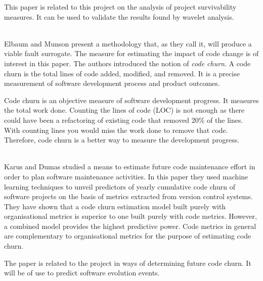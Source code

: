 \begin{description}
		This paper is related to this project on the analysis of project survivability
		measures. It can be used to validate the results found by wavelet analysis.
	
	\item[\cite{elbaum}] \hfill \\
		Elbaum and Munson present a methodology that, as they call it, will produce a
		viable fault surrogate. The measure for estimating the impact of code change
		is of interest in this paper. The authors introduced the notion of \emph{code
		churn}. A code churn is the total lines of code added, modified, and removed.
		It is a precise measurement of software development process and product
		outcomes.

		Code churn is an objective measure of software development progress. It
		measures the total work done. Counting the lines of code (LOC) is not enough
		as there could have been a refactoring of existing code that removed 20\% of
		the lines. With counting lines you would miss the work done to remove that
		code. Therefore, code churn is a better way to measure the development
		progress.
	
	\item[\cite{dumas}] \hfill \\
		Karus and Dumas studied a means to estimate future code maintenance effort in
		order to plan software maintenance activities. In this paper they used machine
		learning techniques to unveil predictors of yearly cumulative code churn of
		software projects on the basis of metrics extracted from version control
		systems. They have shown that a code churn estimation model built purely with
		organisational metrics is superior to one built purely with code metrics.
		However, a combined model provides the highest predictive power. Code metrics
		in general are complementary to organisational metrics for the purpose of
		estimating code churn.

		The paper is related to the project in ways of determining future code churn.
		It will be of use to predict software evolution events.
\end{description}

